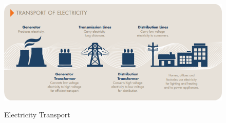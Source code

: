\documentclass[12pt]{article}
\begin{document}
\begin{flushleft}
\begin{figure}[!h]
  \centering
  \includegraphics[width=\textwidth]{transport.png}
    \caption{Electricity Transport}
    \parencite{aemo1pic}
\end{figure}
\end{flushleft}
\newpage
\end{document}

